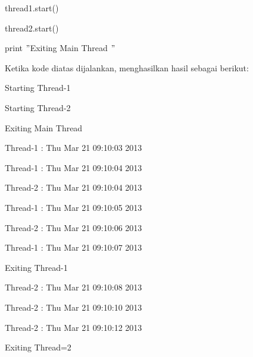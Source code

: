 \documentclass{wileySix}
\begin{document}
\begin{myEnumerate}
\noindent 
{\fontsize{9pt}{9pt}\selectfont thread1.start()} \par
\noindent 
{\fontsize{9pt}{9pt}\selectfont thread2.start()} \par
\noindent 
{\fontsize{9pt}{9pt}\selectfont print  $ " $Exiting Main Thread $ " $} \par
\vspace{12pt}
\begin{adjustwidth}
Ketika kode diatas dijalankan, menghasilkan hasil sebagai berikut:\end{adjustwidth}
\par
\noindent 
{\fontsize{10pt}{10pt}\selectfont Starting Thread-1} \par
\noindent 
{\fontsize{10pt}{10pt}\selectfont Starting Thread-2} \par
\noindent 
{\fontsize{10pt}{10pt}\selectfont Exiting Main Thread} \par
\noindent 
{\fontsize{10pt}{10pt}\selectfont Thread-1 : Thu Mar 21 09:10:03 2013} \par
\noindent 
{\fontsize{10pt}{10pt}\selectfont Thread-1 : Thu Mar 21 09:10:04 2013} \par
\noindent 
{\fontsize{10pt}{10pt}\selectfont Thread-2 : Thu Mar 21 09:10:04 2013} \par
\noindent 
{\fontsize{10pt}{10pt}\selectfont Thread-1 : Thu Mar 21 09:10:05 2013} \par
\noindent 
{\fontsize{10pt}{10pt}\selectfont Thread-2 : Thu Mar 21 09:10:06 2013} \par
\noindent 
{\fontsize{10pt}{10pt}\selectfont Thread-1 : Thu Mar 21 09:10:07 2013} \par
\noindent 
{\fontsize{10pt}{10pt}\selectfont Exiting Thread-1} \par
\noindent 
{\fontsize{10pt}{10pt}\selectfont Thread-2 : Thu Mar 21 09:10:08 2013} \par
\noindent 
{\fontsize{10pt}{10pt}\selectfont Thread-2 : Thu Mar 21 09:10:10 2013} \par
\noindent 
{\fontsize{10pt}{10pt}\selectfont Thread-2 : Thu Mar 21 09:10:12 2013} \par
\noindent 
{\fontsize{10pt}{10pt}\selectfont Exiting Thread=2} \par
\vspace{12pt}

\end{myEnumerate}
\end{document}
